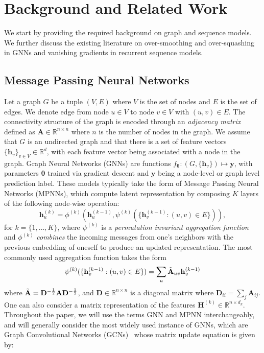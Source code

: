 \section{Background and Related Work}
\label{sec: Prelims}

We start by providing the required background on graph and sequence models. We further discuss the existing literature on over-smoothing and over-squashing in GNNs and vanishing gradients in recurrent sequence models. 
\vspace{-0.2cm}
\subsection{Message Passing Neural Networks}

Let a graph $G$ be a tuple $(V, E)$ where $V$ is the set of nodes and $ E$ is the set of edges. We denote edge from node $u\in V$ to node $v\in V$ with $(u,v)\in E$. The connectivity structure of the graph is encoded through an \textit{adjacency matrix} defined as $\mathbf{A} \in \mathbb{R}^{n\times n}$ where $n$ is the number of nodes in the graph. We assume that $G$ is an undirected graph and that there is a set of feature vectors $\{\mathbf{h}_{v}\}_{v\in V} \in \mathbb{R}^d$, with each feature vector being associated with a node in the graph. Graph Neural Networks (GNNs) are functions $f_{\boldsymbol{\theta}}: (G, \{\mathbf{h}_{v}\}) \mapsto \mathbf{y}$, with parameters $\boldsymbol{\theta}$ trained via gradient descent and $\mathbf{y}$ being a node-level or graph level prediction label. These models typically take the form of Message Passing Neural Networks (MPNNs), which compute latent representation by composing $K$ layers of the following node-wise operation:
\begin{equation}
    \mathbf{h}_{u}^{(k)} = \phi^{(k)} ( \mathbf{h}_{u}^{(k-1)}, \psi^{(k)} ( \{ \mathbf{h}_{v}^{(k-1)} : (u,v)\in E \} ) ),
\end{equation}
for $k=\{1,\hdots, K\}$, where $\psi^{(k)}$ is a \textit{permutation invariant aggregation function} and $\phi^{(k)}$ \textit{combines} the incoming messages from one's neighbors with the previous embedding of oneself to produce an updated representation. The most commonly used aggregation function takes the form 
\begin{equation}
    \psi^{(k)} ( \{ \mathbf{h}_{v}^{(k-1)} : (u,v)\in E \} )
    = \sum_{u}\Tilde{\mathbf{A}}_{uv}\mathbf{h}_{v}^{(k-1)}
\end{equation}
where $\Tilde{\mathbf{A}} = \mathbf{D}^{-\frac{1}{2}}\mathbf{A}\mathbf{D}^{-\frac{1}{2}}$, and $\mathbf{D}\in\mathbb{R}^{n\times n}$ is a diagonal matrix where $\mathbf{D}_{ii}=\sum_j\mathbf{A}_{ij}$. One can also consider a matrix representation of the features $\mathbf{H}^{(k)}\in\mathbb{R}^{n\times d_k}$. Throughout the paper, we will use the terms GNN and MPNN interchangeably, and will generally consider the most widely used instance of GNNs, which are Graph Convolutional Networks (GCNs)~\citep{kipf2017semisupervised} whose matrix update equation is given by:

